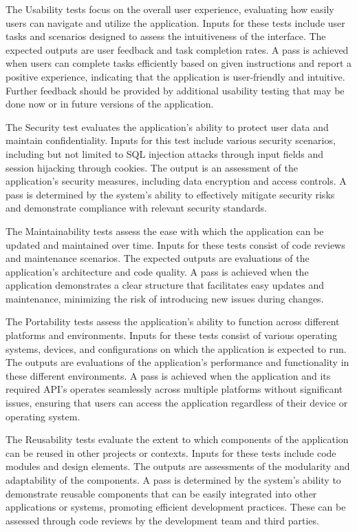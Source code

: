 \documentclass[12pt, titlepage]{article}
\begin{document}
The Usability tests focus on the overall user experience, evaluating how easily users 
can navigate and utilize the application. Inputs for these tests include user tasks 
and scenarios designed to assess the intuitiveness of the interface. The expected 
outputs are user feedback and task completion rates. A pass is achieved when users 
can complete tasks efficiently based on given instructions and report a positive 
experience, indicating that the application is user-friendly and intuitive. Further 
feedback should be provided by additional usability testing that may be done now or in
future versions of the application.

The Security test evaluates the application's ability to protect user data and maintain 
confidentiality. Inputs for this test include various security scenarios, including but 
not limited to SQL injection attacks through input fields and session hijacking through cookies.
The output is an assessment of the application's 
security measures, including data encryption and access controls. A pass is determined 
by the system's ability to effectively mitigate security risks and demonstrate 
compliance with relevant security standards.

The Maintainability tests assess the ease with which the application can be updated 
and maintained over time. Inputs for these tests consist of code reviews and 
maintenance scenarios. The expected outputs are evaluations of the application's 
architecture and code quality. A pass is achieved when the application demonstrates 
a clear structure that facilitates easy updates and maintenance, minimizing the 
risk of introducing new issues during changes.

The Portability tests assess the application's ability to function across different 
platforms and environments. Inputs for these tests consist of various operating 
systems, devices, and configurations on which the application is expected to run. 
The outputs are evaluations of the application's performance and functionality in 
these different environments. A pass is achieved when the application and its required API's
operates seamlessly across multiple platforms without significant issues, ensuring that 
users can access the application regardless of their device or operating system.

The Reusability tests evaluate the extent to which components of the application 
can be reused in other projects or contexts. Inputs for these tests include code 
modules and design elements. The outputs are assessments of the modularity and 
adaptability of the components. A pass is determined by the system's ability to 
demonstrate reusable components that can be easily integrated into other 
applications or systems, promoting efficient development practices. These can be assessed
through code reviews by the development team and third parties.
\end{document}

